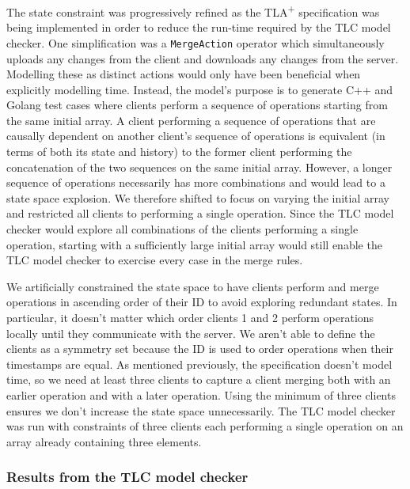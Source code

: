 \documentclass{vldb}
\begin{document}
The state constraint was progressively refined as the TLA\textsuperscript{+} specification was being implemented in order to reduce the run-time required by the TLC model checker. One simplification was a \texttt{MergeAction} operator which simultaneously uploads any changes from the client and downloads any changes from the server. Modelling these as distinct actions would only have been beneficial when explicitly modelling time. Instead, the model's purpose is to generate C++ and Golang test cases where clients perform a sequence of operations starting from the same initial array. A client performing a sequence of operations that are causally dependent on another client's sequence of operations is equivalent (in terms of both its state and history) to the former client performing the concatenation of the two sequences on the same initial array. However, a longer sequence of operations necessarily has more combinations and would lead to a state space explosion. We therefore shifted to focus on varying the initial array and restricted all clients to performing a single operation. Since the TLC model checker would explore all combinations of the clients performing a single operation, starting with a sufficiently large initial array would still enable the TLC model checker to exercise every case in the merge rules.

We artificially constrained the state space to have clients perform and merge operations in ascending order of their ID to avoid exploring redundant states. In particular, it doesn't matter which order clients 1 and 2 perform operations locally until they communicate with the server. We aren't able to define the clients as a symmetry set because the ID is used to order operations when their timestamps are equal. As mentioned previously, the specification doesn't model time, so we need at least three clients to capture a client merging both with an earlier operation and with a later operation.
Using the minimum of three clients ensures we don't increase the state space unnecessarily.
The TLC model checker was run with constraints of three clients each performing a single operation on an array already containing three elements.

\subsubsection{Results from the TLC model checker}
\end{document}
